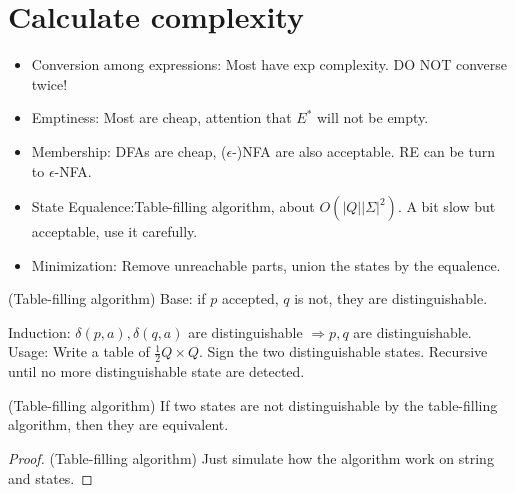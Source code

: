     \section{Calculate complexity}
    \begin{itemize}
        \item Conversion among expressions: Most have exp complexity. DO NOT converse twice!
        \item Emptiness: Most are cheap, attention that $E^{*}$ will not be empty.
        \item Membership: DFAs are cheap, ($\epsilon$-)NFA are also acceptable. RE can be turn to $\epsilon$-NFA.
        \item State Equalence:Table-filling algorithm, about $O(|Q| |\Sigma|^2)$. A bit slow but acceptable, use it carefully.
        \item Minimization: Remove unreachable parts, union the states by the equalence.
    \end{itemize}
    \begin{definition}
        (Table-filling algorithm) 
        Base: if $p$ accepted, $q$ is not, they are distinguishable.

        Induction: $\delta(p,a),\delta(q,a)$ are distinguishable $\Rightarrow p,q$ are distinguishable.
        Usage: Write a table of $\frac{1}{2}Q\times Q$. Sign the two distinguishable states. Recursive until no more distinguishable state are detected.
    \end{definition}
    \begin{theorem}
        (Table-filling algorithm) If two states are not distinguishable by the table-filling algorithm, then they are equivalent.
    \end{theorem}
    \begin{proof}
        (Table-filling algorithm) Just simulate how the algorithm work on string and states.
    \end{proof}

